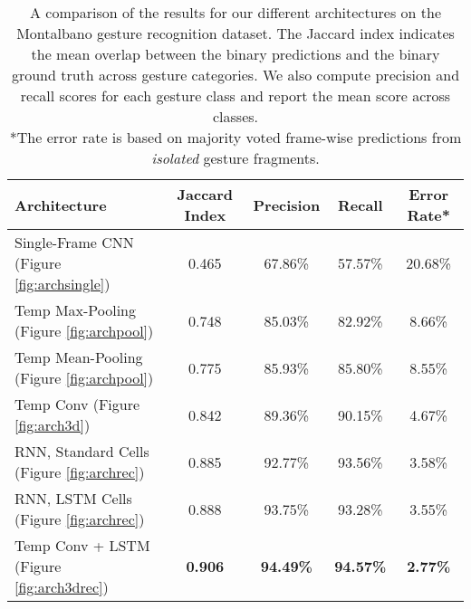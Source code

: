 \documentclass[11pt,a4paper]{article} \usepackage{a4wide}
\begin{document}
\begin{table}[t]
\centering
\begin{tabular}{lcccc}
\toprule
\multicolumn{1}{l}{\bf Architecture}  &\multicolumn{1}{c}{\bf Jaccard Index}  &\multicolumn{1}{c}{\bf Precision} &\multicolumn{1}{c}{\bf Recall} &\multicolumn{1}{c}{\bf Error Rate*}\\
\midrule

Single-Frame CNN (Figure \ref{fig:archsingle})					&0.465 &67.86\% &57.57\% &20.68\%\\
Temp Max-Pooling (Figure \ref{fig:archpool})					&0.748 &85.03\% &82.92\% &8.66\%\\
Temp Mean-Pooling (Figure \ref{fig:archpool})					&0.775 &85.93\% &85.80\% &8.55\%\\
Temp Conv (Figure \ref{fig:arch3d})							&0.842 &89.36\% &90.15\% &4.67\%\\
RNN, Standard Cells (Figure \ref{fig:archrec})				&0.885 &92.77\% &93.56\% &3.58\%\\
RNN, LSTM Cells (Figure \ref{fig:archrec})					&0.888 &93.75\% &93.28\% &3.55\%\\
Temp Conv + LSTM (Figure \ref{fig:arch3drec})					&\textbf{0.906} &\textbf{94.49\%} &\textbf{94.57\%} &\textbf{2.77\%}\\
\bottomrule
\end{tabular}
\caption{A comparison of the results for our different architectures on the Montalbano gesture recognition dataset. The Jaccard index indicates the mean overlap between the binary predictions and the binary ground truth across gesture categories. We also compute precision and recall scores for each gesture class and report the mean score across classes. \\ *The error rate is based on majority voted frame-wise predictions from \emph{isolated} gesture fragments. }
\label{tab:results}
\end{table}
\end{document}
